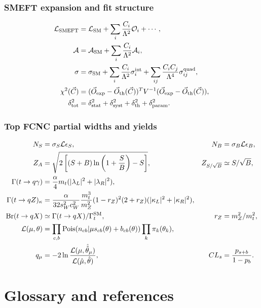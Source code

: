 \documentclass[11pt,a4paper]{report}
\newcommand{\br}{\mathrm{Br}}
\begin{document}
\section{SMEFT expansion and fit structure}
\begin{align}
\mathcal L_{\rm SMEFT}&=\mathcal L_{\rm SM}+\sum_i\frac{C_i}{\Lambda^2}\mathcal O_i+\cdots,\\
\mathcal A&=\mathcal A_{\rm SM}+\sum_i\frac{C_i}{\Lambda^2}\mathcal A_i,\\
\sigma&=\sigma_{\rm SM}+\sum_i\frac{C_i}{\Lambda^2}\sigma_i^{\rm int}+\sum_{ij}\frac{C_iC_j}{\Lambda^4}\sigma_{ij}^{\rm quad},\\
\chi^2(\vec C)&=(\vec O_{\rm exp}-\vec O_{\rm th}(\vec C))^TV^{-1}(\vec O_{\rm exp}-\vec O_{\rm th}(\vec C)),\\
\delta_{\rm tot}^2&=\delta_{\rm stat}^2+\delta_{\rm syst}^2+\delta_{\rm th}^2+\delta_{\rm param}^2.
\end{align}
\section{Top FCNC partial widths and yields}
\begin{align}
N_S&=\sigma_S\mathcal L\epsilon_S, & N_B&=\sigma_B\mathcal L\epsilon_B,\\
Z_A&=\sqrt{2\left[(S+B)\ln\left(1+\frac{S}{B}\right)-S\right]}, & Z_{S/\sqrt B}&\simeq S/\sqrt B,\\
\Gamma(t\to q\gamma)&=\frac{\alpha}{4}m_t(|\lambda_L|^2+|\lambda_R|^2),\\
\Gamma(t\to qZ)_\kappa&=\frac{\alpha}{32s_W^2c_W^2}\frac{m_t^3}{m_Z^2}(1-r_Z)^2(2+r_Z)(|\kappa_L|^2+|\kappa_R|^2),\\
\br(t\to qX)&\simeq\Gamma(t\to qX)/\Gamma_t^{\rm SM}, & r_Z&=m_Z^2/m_t^2,\\
\mathcal L(\mu,\theta)&=\prod_{c,b}{\rm Pois}(n_{cb}|\mu s_{cb}(\theta)+b_{cb}(\theta))\prod_k\pi_k(\theta_k),\\
q_\mu&=-2\ln\frac{\mathcal L(\mu,\hat{\hat\theta}_\mu)}{\mathcal L(\hat\mu,\hat\theta)}, & CL_s&=\frac{p_{s+b}}{1-p_b}.
\end{align}

\part{Glossary and references}
\end{document}
